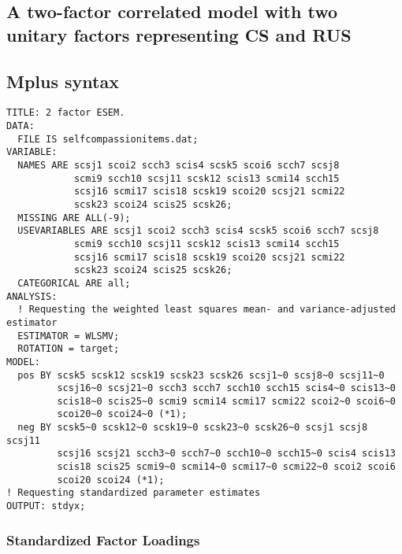 \begin{appendix}
\newpage

\hypertarget{a-two-factor-correlated-model-with-two-unitary-factors-representing-cs-and-rus}{%
\section{A two-factor correlated model with two unitary factors
representing CS and
RUS}\label{a-two-factor-correlated-model-with-two-unitary-factors-representing-cs-and-rus}}

\hypertarget{mplus-syntax}{%
\subsection{Mplus syntax}\label{mplus-syntax}}

\begin{verbatim}
TITLE: 2 factor ESEM.
DATA:
  FILE IS selfcompassionitems.dat;
VARIABLE:
  NAMES ARE scsj1 scoi2 scch3 scis4 scsk5 scoi6 scch7 scsj8 
            scmi9 scch10 scsj11 scsk12 scis13 scmi14 scch15 
            scsj16 scmi17 scis18 scsk19 scoi20 scsj21 scmi22 
            scsk23 scoi24 scis25 scsk26; 
  MISSING ARE ALL(-9);
  USEVARIABLES ARE scsj1 scoi2 scch3 scis4 scsk5 scoi6 scch7 scsj8 
            scmi9 scch10 scsj11 scsk12 scis13 scmi14 scch15 
            scsj16 scmi17 scis18 scsk19 scoi20 scsj21 scmi22 
            scsk23 scoi24 scis25 scsk26; 
  CATEGORICAL ARE all;
ANALYSIS:
  ! Requesting the weighted least squares mean- and variance-adjusted estimator
  ESTIMATOR = WLSMV;
  ROTATION = target;
MODEL:
  pos BY scsk5 scsk12 scsk19 scsk23 scsk26 scsj1~0 scsj8~0 scsj11~0 
         scsj16~0 scsj21~0 scch3 scch7 scch10 scch15 scis4~0 scis13~0 
         scis18~0 scis25~0 scmi9 scmi14 scmi17 scmi22 scoi2~0 scoi6~0 
         scoi20~0 scoi24~0 (*1);
  neg BY scsk5~0 scsk12~0 scsk19~0 scsk23~0 scsk26~0 scsj1 scsj8 scsj11 
         scsj16 scsj21 scch3~0 scch7~0 scch10~0 scch15~0 scis4 scis13 
         scis18 scis25 scmi9~0 scmi14~0 scmi17~0 scmi22~0 scoi2 scoi6 
         scoi20 scoi24 (*1);
! Requesting standardized parameter estimates
OUTPUT: stdyx;
\end{verbatim}

\newpage

\hypertarget{standardized-factor-loadings}{%
\subsubsection{Standardized Factor
Loadings}\label{standardized-factor-loadings}}




\end{appendix}
